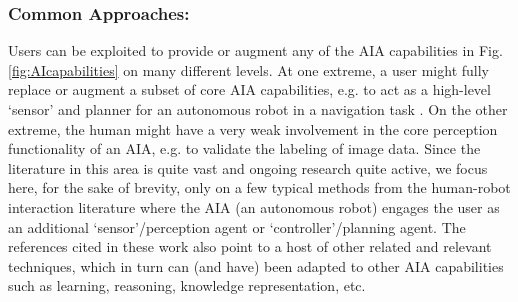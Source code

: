 \subsubsection{Common Approaches:} 
Users can be exploited to provide or augment any of the AIA capabilities in Fig. \ref{fig:AIcapabilities} on many different levels. 
At one extreme, a user might fully replace or augment a subset of core AIA capabilities, e.g. to act as a high-level `sensor' and planner for an autonomous robot in a navigation task \cite{Kaupp2008-yr}.  
On the other extreme, the human might have a very weak involvement in the core perception functionality of an AIA, e.g. to validate the labeling of image data. %
%
Since the literature in this area is quite vast and ongoing research quite active, we focus here, for the sake of brevity, only on a few typical methods from the human-robot interaction literature where the AIA (an autonomous robot) engages the user as an additional `sensor'/perception agent or `controller'/planning agent. The references cited in these work also point to a host of other related and relevant techniques, which in turn can (and have) been adapted to other AIA capabilities such as learning, reasoning, knowledge representation, etc.

